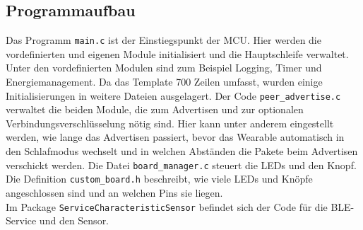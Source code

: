 \subsection{Programmaufbau}
Das Programm \texttt{main.c} ist der Einstiegspunkt der MCU.
Hier werden die vordefinierten und eigenen Module initialisiert und die Hauptschleife verwaltet.
Unter den vordefinierten Modulen sind zum Beispiel Logging, Timer und Energiemanagement.
Da das Template 700 Zeilen umfasst, wurden einige Initialisierungen in weitere Dateien ausgelagert.
Der Code \texttt{peer\_advertise.c} verwaltet die beiden Module, die zum Advertisen und zur optionalen Verbindungsverschlüsselung nötig sind.
Hier kann unter anderem eingestellt werden, wie lange das Advertisen passiert, bevor das Wearable automatisch in den Schlafmodus wechselt und in welchen Abständen die Pakete beim Advertisen verschickt werden.
Die Datei \texttt{board\_manager.c} steuert die LEDs und den Knopf.
Die Definition \texttt{custom\_board.h} beschreibt, wie viele LEDs und Knöpfe angeschlossen sind und an welchen Pins sie liegen.\\
Im Package \texttt{ServiceCharacteristicSensor} befindet sich der Code für die BLE-Service und den Sensor.

